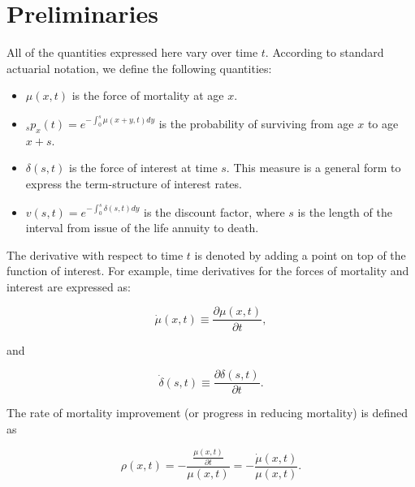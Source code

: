 \documentclass[12pt]{article}
\begin{document}
\section{Preliminaries}\label{preliminaries}

All of the quantities expressed here vary over time $t$. According to standard actuarial notation, we define the following quantities:

\begin{itemize}

\item
\(\mu(x,t)\) is the force of mortality at age \(x\).

\item
$_sp_x(t)=e^{-\int_{0}^{s}\mu(x+y,t)dy}$ is the probability of surviving from age \(x\) to age \(x+s\).


\item
\(\delta(s,t)\) is the force of interest at time $s$. This measure is a general form to express the term-structure of interest rates.

\item 

${v}(s,t)=e^{-\int_{0}^{s}\delta(s,t)dy}$ is the discount factor, where $s$ is the length of the interval from issue of the life annuity to death.

\end{itemize}

The derivative with respect to time $t$ is denoted by adding a point on top of the function of interest. For example, time derivatives for the forces of mortality and interest are expressed as:

\begin{equation} \label{eq:mudot}
\dot{\mu}(x,t)\equiv\frac{\partial\mu(x,t)}{\partial t},
\end{equation}

and 

\begin{equation} \label{eq:mudot}
\dot{\delta}(s,t)\equiv\frac{\partial\delta(s,t)}{\partial t}.
\end{equation}



The rate of mortality improvement (or progress in reducing mortality) is defined as


\begin{equation} \label{eq:rho}
\rho(x,t)=-\frac{\frac{\mu(x,t)}{\partial t}}{\mu(x,t)} = - \frac{\dot{\mu}(x,t)}{\mu(x,t)}.
\end{equation}
\end{document}
